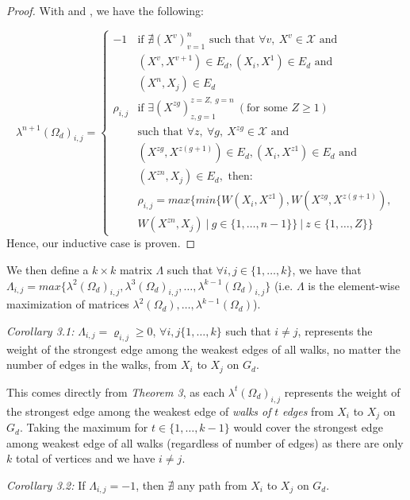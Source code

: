 \documentclass{article} %
\newcommand*\circled[1]{\tikz[baseline=(char.base)]{
            \node[shape=circle,draw,inner sep=2pt] (char) {#1};}}
\begin{document}
\begin{proof}
With \circled{1} and \circled{2}, we have the following:

\[
\lambda^{n+1}(\Omega_d)_{i,j}=
\begin{cases}
-1 & \textrm{if } \nexists (X^v)_{v=1}^{n} \textrm{ such that } \forall v,\ X^v\in\mathcal{X}\textrm{ and } \\
  & (X^v,X^{v+1})\in E_d, (X_i,X^1)\in E_d \textrm{ and } \\
  & (X^{n},X_j)\in E_d\\ 
\rho_{i,j} & \textrm{if }\exists (X^{zg})_{z,g=1}^{z=Z,\ g=n}\ (\textrm{for some }Z\geq1) \\
  & \textrm{such that }\forall z,\ \forall g,\ X^{zg}\in\mathcal{X} \textrm{ and } \\
  & (X^{zg},X^{z(g+1)})\in E_d, (X_i, X^{z1})\in E_d \textrm{ and } \\
  & (X^{zn},X_j)\in E_d, \textrm{ then: } \\
  & \rho_{i,j}=max\Big\{min\big\{W(X_i,X^{z1}),W(X^{zg},X^{z(g+1)}), \\
  & W(X^{zn},X_j)\ |\ g\in\{1,\ldots,n-1\}\big\}\ |\ z\in\{1,\ldots,Z\}\Big\}
\end{cases}
\]
Hence, our inductive case is proven.
\end{proof}

We then define a $k\times k$ matrix $\Lambda$ such that $\forall i,j\in\{1,\ldots,k\}$, we have that $\Lambda_{i,j}=max\{\lambda^2(\Omega_d)_{i,j},\lambda^3(\Omega_d)_{i,j},\ldots,\lambda^{k-1}(\Omega_d)_{i,j}\}$ (i.e. $\Lambda$ is the element-wise maximization of matrices $\lambda^2(\Omega_d),\ldots,\lambda^{k-1}(\Omega_d)$). 

\textit{Corollary 3.1:} $\Lambda_{i,j}=\varrho_{i,j}\geq0$, $\forall i,j\{1,\ldots,k\}$ such that $i\not=j$, represents the weight of the strongest edge among the weakest edges of all walks, no matter the number of edges in the walks, from $X_i$ to $X_j$ on $G_d$.

This comes directly from \textit{Theorem 3}, as each $\lambda^t(\Omega_d)_{i,j}$ represents the weight of the strongest edge among the weakest edge of \textit{walks of} $t$ \textit{edges} from $X_i$ to $X_j$ on $G_d$. Taking the maximum for $t\in\{1,\ldots,k-1\}$ would cover the strongest edge among weakest edge of all walks (regardless of number of edges) as there are only $k$ total of vertices and we have $i\not=j$.

\textit{Corollary 3.2:} If $\Lambda_{i,j}=-1$, then $\nexists$ any path from $X_i$ to $X_j$ on $G_d$.
\end{document}
